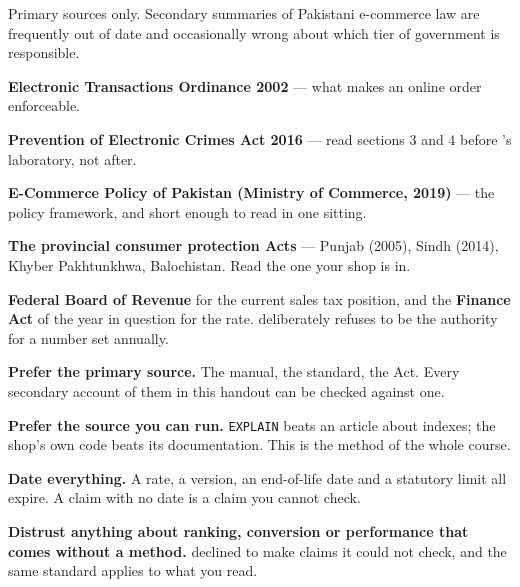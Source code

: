 \begin{examplebox}
Primary sources only. Secondary summaries of Pakistani e-commerce law are
frequently out of date and occasionally wrong about which tier of government
is responsible.

\begin{tight}
  \item \textbf{Electronic Transactions Ordinance 2002} --- what makes an
        online order enforceable.
  \item \textbf{Prevention of Electronic Crimes Act 2016} --- read sections 3
        and 4 before 's laboratory, not after.
  \item \textbf{E-Commerce Policy of Pakistan (Ministry of Commerce, 2019)} ---
        the policy framework, and short enough to read in one sitting.
  \item \textbf{The provincial consumer protection Acts} --- Punjab (2005),
        Sindh (2014), Khyber Pakhtunkhwa, Balochistan. Read the one your shop
        is in.
  \item \textbf{Federal Board of Revenue} for the current sales tax position,
        and the \textbf{Finance Act} of the year in question for the rate.
         deliberately refuses to be the authority for a number
        set annually.
\end{tight}
\end{examplebox}

\begin{conceptbox}
\begin{tightnum}
  \item \textbf{Prefer the primary source.} The manual, the standard, the Act.
        Every secondary account of them in this handout can be checked against
        one.
  \item \textbf{Prefer the source you can run.} \texttt{EXPLAIN} beats an
        article about indexes; the shop's own code beats its documentation.
        This is the method of the whole course.
  \item \textbf{Date everything.} A rate, a version, an end-of-life date and a
        statutory limit all expire. A claim with no date is a claim you cannot
        check.
  \item \textbf{Distrust anything about ranking, conversion or performance that
        comes without a method.}  declined to make claims it could
        not check, and the same standard applies to what you read.
\end{tightnum}
\end{conceptbox}


